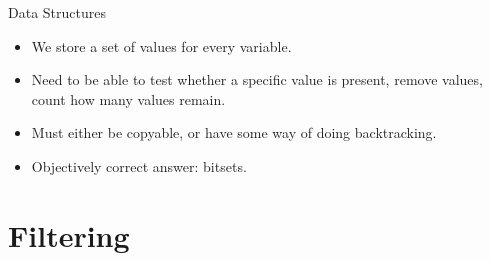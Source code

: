 \documentclass[aspectratio=169,compress,10pt]{beamer}
\begin{document}
\begin{frame}{Data Structures}
    \begin{itemize}
        \item We store a set of values for every variable.
        \item Need to be able to test whether a specific value is present, remove values,
            count how many values remain.
        \item Must either be copyable, or have some way of doing backtracking.
        \item <2-> Objectively correct answer: bitsets.
    \end{itemize}
\end{frame}

\section{Filtering}
\end{document}
